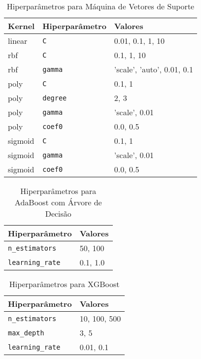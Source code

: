 \begin{table}[h]
\centering
\caption{Hiperparâmetros para Máquina de Vetores de Suporte}
\label{tab:svm_hyperparams}

\begin{tabular}{lll}
\hline
\textbf{Kernel} & \textbf{Hiperparâmetro} & \textbf{Valores} \\
\hline
linear & \texttt{C} & 0.01, 0.1, 1, 10 \\
rbf & \texttt{C} & 0.1, 1, 10 \\
rbf & \texttt{gamma} & 'scale', 'auto', 0.01, 0.1 \\
poly & \texttt{C} & 0.1, 1 \\
poly & \texttt{degree} & 2, 3 \\
poly & \texttt{gamma} & 'scale', 0.01 \\
poly & \texttt{coef0} & 0.0, 0.5 \\
sigmoid & \texttt{C} & 0.1, 1 \\
sigmoid & \texttt{gamma} & 'scale', 0.01 \\
sigmoid & \texttt{coef0} & 0.0, 0.5 \\
\hline
\end{tabular}

\end{table}

\begin{table}[h]
\centering
\caption{Hiperparâmetros para AdaBoost com Árvore de Decisão}
\label{tab:adaboost_hyperparams}

\begin{tabular}{ll}
\hline
\textbf{Hiperparâmetro} & \textbf{Valores} \\
\hline
\texttt{n\_estimators} & 50, 100 \\
\texttt{learning\_rate} & 0.1, 1.0 \\
\hline
\end{tabular}

\end{table}

\begin{table}[h]
\centering
\caption{Hiperparâmetros para XGBoost}
\label{tab:xgboost_hyperparams}

\begin{tabular}{ll}
\hline
\textbf{Hiperparâmetro} & \textbf{Valores} \\
\hline
\texttt{n\_estimators} & 10, 100, 500 \\
\texttt{max\_depth} & 3, 5 \\
\texttt{learning\_rate} & 0.01, 0.1 \\
\hline
\end{tabular}

\end{table}
